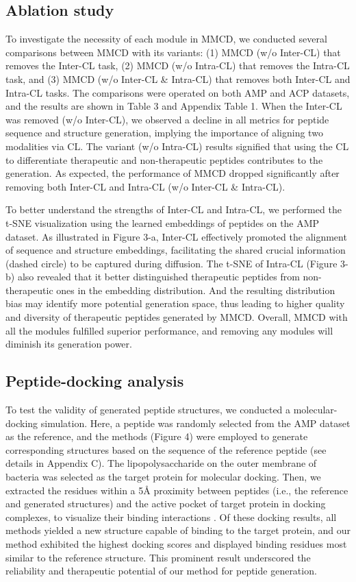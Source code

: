 \documentclass[letterpaper]{article} %
\begin{document}
\subsection{Ablation study}
To investigate the necessity of each module in MMCD, we conducted several comparisons between MMCD with its variants: (1) MMCD (w/o Inter-CL) that removes the Inter-CL task, (2) MMCD (w/o Intra-CL) that removes the Intra-CL task, and (3) MMCD (w/o Inter-CL \& Intra-CL) that removes both Inter-CL and Intra-CL tasks. The comparisons were operated on both AMP and ACP datasets, and the results are shown in Table 3 and Appendix Table 1. When the Inter-CL was removed (w/o Inter-CL), we observed a decline in all metrics for peptide sequence and structure generation, implying the importance of aligning two modalities via CL. The variant (w/o Intra-CL) results signified that using the CL to differentiate therapeutic and non-therapeutic peptides contributes to the generation. As expected, the performance of MMCD dropped significantly after removing both Inter-CL and Intra-CL (w/o Inter-CL \& Intra-CL).

To better understand the strengths of Inter-CL and Intra-CL, we performed the t-SNE \citep{tsne} visualization using the learned embeddings of peptides on the AMP dataset. As illustrated in Figure 3-a, Inter-CL effectively promoted the alignment of sequence and structure embeddings, facilitating the shared crucial information (dashed circle) to be captured during diffusion. The t-SNE of Intra-CL (Figure 3-b) also revealed that it better distinguished therapeutic peptides from non-therapeutic ones in the embedding distribution. And the resulting distribution bias may identify more potential generation space, thus leading to higher quality and diversity of therapeutic peptides generated by MMCD. Overall, MMCD with all the modules fulfilled superior performance, and removing any modules will diminish its generation power.

\subsection{Peptide-docking analysis}
To test the validity of generated peptide structures, we conducted a molecular-docking simulation. Here, a peptide was randomly selected from the AMP dataset as the reference, and the methods (Figure 4) were employed to generate corresponding structures based on the sequence of the reference peptide (see details in Appendix C). The lipopolysaccharide on the outer membrane of bacteria \cite{liStructuralBasis2019} was selected as the target protein for molecular docking. Then, we extracted the residues within a 5Å proximity between peptides (i.e., the reference and generated structures) and the active pocket of target protein in docking complexes, to visualize their binding interactions \cite{millerReliableAccurate2021}. Of these docking results, all methods yielded a new structure capable of binding to the target protein, and our method exhibited the highest docking scores and displayed binding residues most similar to the reference structure. This prominent result underscored the reliability and therapeutic potential of our method for peptide generation.
\end{document}
